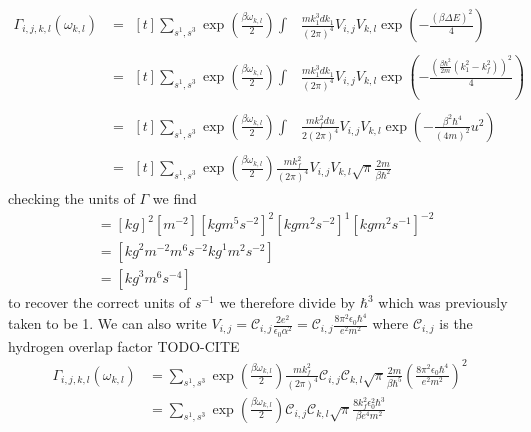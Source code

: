 \begin{align}
  \Gamma_{i,j, k,l}(\omega_{k,l}) & =\begin{aligned}[t]
    \sum_{s^1,s^3} \exp{(\frac{\beta \omega_{k,l}}{2})} \int &
    \frac{m k_1^3 dk_1}{{(2\pi)}^4}
    V_{i,j} V_{k,l} \exp{(- \frac{{(\beta \Delta E)}^2}{4})}
  \end{aligned} \\
                                  & =\begin{aligned}[t]
    \sum_{s^1,s^3} \exp{(\frac{\beta \omega_{k,l}}{2})} \int &
    \frac{m k_1^3 dk_1}{{(2\pi)}^4}
    V_{i,j} V_{k,l} \exp{(- \frac{{(\frac{\beta \hbar^2}{2 m}(k_1^2 - k_f^2))}^2}{4})}
  \end{aligned} \\
                                  & =\begin{aligned}[t]
    \sum_{s^1,s^3} \exp{(\frac{\beta \omega_{k,l}}{2})} \int &
    \frac{m k_f^2 du}{2{(2\pi)}^4}
    V_{i,j} V_{k,l} \exp{(- \frac{\beta^2 \hbar^4}{{(4m)}^2} u^2)}
  \end{aligned} \\
                                  & =\begin{aligned}[t]
    \sum_{s^1,s^3} \exp{(\frac{\beta \omega_{k,l}}{2})} \frac{m k_f^2 }{{(2\pi)}^4}
    V_{i,j} V_{k,l} \sqrt{\pi} \frac{2m}{\beta \hbar^2}
  \end{aligned}
\end{align}
checking the units of \(\Gamma \) we find
\begin{align}
  [\Gamma] & = {[kg]}^2[m^{-2}]{[kgm^5s^{-2}]}^2{[kgm^2s^{-2}]}^{1}{[kg m^2 s^{-1}]}^{-2} \\
           & = [{kg}^2 m^{-2} m^{6} s^{-2} {kg}^{1} m^{2} s^{-2}]                         \\
           & = [{kg}^3 m^{6}s^{-4}]
\end{align}
to recover the correct units of \(s^{-1}\) we
therefore divide by \(\hbar^3 \) which was previously
taken to be 1. We can also write
\(V_{i,j}
= \mathcal{C}_{i,j} \frac{2e^2}{\epsilon_0 \alpha^2}
= \mathcal{C}_{i,j} \frac{8 \pi^2 \epsilon_0 \hbar^4}{e^2 m^2}\)
where \(\mathcal{C}_{i,j}\) is the hydrogen
overlap factor TODO-CITE
\begin{align}
  \Gamma_{i,j, k,l}(\omega_{k,l}) & =
  \sum_{s^1,s^3} \exp{(\frac{\beta \omega_{k,l}}{2})}
  \frac{m k_f^2 }{{(2\pi)}^4}
  \mathcal{C}_{i,j} \mathcal{C}_{k,l}
  \sqrt{\pi} \frac{2m}{\beta \hbar^5} {(\frac{8 \pi^2 \epsilon_0 \hbar^4}{e^2 m^2})}^2 \\
                                  & =
  \sum_{s^1,s^3} \exp{(\frac{\beta \omega_{k,l}}{2})}
  \mathcal{C}_{i,j} \mathcal{C}_{k,l}
  \sqrt{\pi} \frac{8 k_f^2 \epsilon_0^2 \hbar^3}{\beta e^4 m^2}
\end{align}

